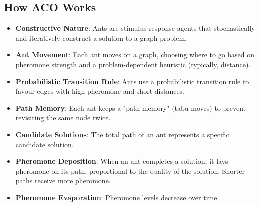 \subsection*{How ACO Works}
\begin{itemize}
\item \textbf{Constructive Nature}:  Ants are stimulus-response agents that stochastically and iteratively construct a solution to a graph problem.
\item \textbf{Ant Movement}: Each ant moves on a graph, choosing where to go based on pheromone strength and a problem-dependent heuristic (typically, distance).
\item \textbf{Probabilistic Transition Rule}: Ants use a probabilistic transition rule to favour edges with high pheromone and short distances.
\item \textbf{Path Memory}: Each ant keeps a "path memory" (tabu moves) to prevent revisiting the same node twice.
\item \textbf{Candidate Solutions}: The total path of an ant represents a specific candidate solution.
\item \textbf{Pheromone Deposition}: When an ant completes a solution, it lays pheromone on its path, proportional to the quality of the solution. Shorter paths receive more pheromone.
\item \textbf{Pheromone Evaporation}: Pheromone levels decrease over time.
\end{itemize}
